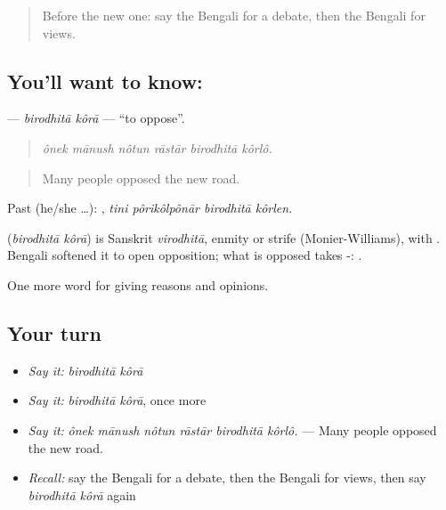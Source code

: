 \label{lesson:BN-C334-birodhita-kora}



\begin{quote}
Before the new one: say the Bengali for a debate, then the Bengali for views.
\end{quote}

\subsection*{You'll want to know:  }
\textbf{ } — \emph{birodhitā kôrā} — \textquotedblleft{}to oppose\textquotedblright{}.

\begin{quote}
     
\end{quote}

\begin{quote}
\emph{ônek mānush nôtun rāstār birodhitā kôrlô.}
\end{quote}

\begin{quote}
Many people opposed the new road.
\end{quote}

Past (he/she …):    , \emph{tini pôrikôlpônār birodhitā kôrlen}.

\begin{cousinweb}
\textbf{ } (\emph{birodhitā kôrā}) is Sanskrit \emph{virodhitā}, enmity or strife (Monier-Williams), with . Bengali softened it to open opposition; what is opposed takes -:  .
\end{cousinweb}

\begin{grammarlens}[title={What you've built}]
One more word for giving reasons and opinions.
\end{grammarlens}

\subsection*{Your turn}
\begin{itemize}
\raggedright
  \item \emph{Say it:} \emph{birodhitā kôrā}
  \item \emph{Say it:} \emph{birodhitā kôrā}, once more
  \item \emph{Say it:} \emph{ônek mānush nôtun rāstār birodhitā kôrlô.} — Many people opposed the new road.
  \item \emph{Recall:} say the Bengali for a debate, then the Bengali for views, then say \emph{birodhitā kôrā} again
\end{itemize}

